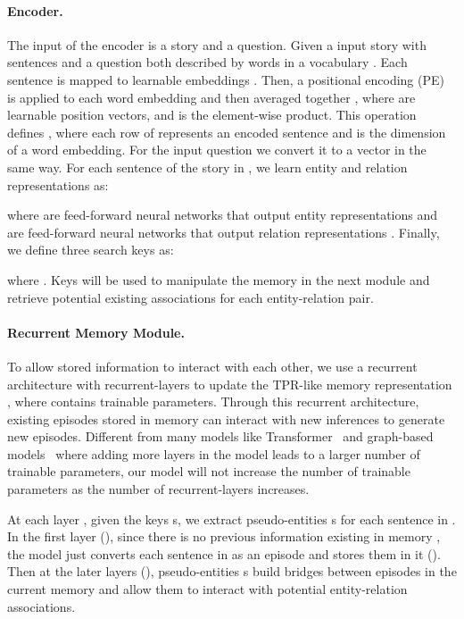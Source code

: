 \documentclass[letterpaper]{article} \usepackage{aaai22}  \usepackage{times}  \usepackage{helvet}  \usepackage{courier}  \usepackage[hyphens]{url}  \usepackage{graphicx} \urlstyle{rm} \def\UrlFont{\rm}  \usepackage{natbib}  \usepackage{caption} \DeclareCaptionStyle{ruled}{labelfont=normalfont,labelsep=colon,strut=off} \frenchspacing  \setlength{\pdfpagewidth}{8.5in}  \setlength{\pdfpageheight}{11in}  \usepackage{algorithm}
\begin{document}
\paragraph{Encoder.}
The input of the encoder is a story and a question.
Given a input story  with  sentences and a question  both described by words in a vocabulary . Each sentence  is mapped to learnable embeddings . 
Then, a positional encoding (PE) is applied to each word embedding and then averaged together
, where  are learnable position vectors, and  is the element-wise product. This operation defines , where each row of  represents an encoded sentence and  is the dimension of a word embedding. For the input question we convert it to a vector  in the same way. 
For each sentence of the story in , we learn entity and relation representations as:

where  are feed-forward neural networks that output entity representations  and 
 are feed-forward neural networks that output relation representations . Finally, we define three search keys  as:

where . Keys will be used to manipulate the memory in the next module and retrieve potential existing associations for each entity-relation pair.



\paragraph{Recurrent Memory Module.} To allow stored information to interact with each other, we use a recurrent architecture with  recurrent-layers to update the TPR-like memory representation , where  contains trainable parameters. 
Through this recurrent architecture, existing episodes stored in memory can interact with new inferences to generate new episodes.
Different from many models like Transformer~\cite{vaswani2017attention} and graph-based models~\cite{kipf2016semi, velivckovic2017graph} where adding more layers in the model leads to a larger number of trainable parameters, our model will not increase the number of trainable parameters as the number of recurrent-layers increases.

At each layer , given the keys s, we extract pseudo-entities s for each sentence in . 
In the first layer (), since there is no previous information existing in memory , the model just converts each sentence in  as an episode and stores them in it ().
Then at the later layers (), pseudo-entities s build bridges between episodes in the current memory  and allow them to interact with potential entity-relation associations.
\end{document}
